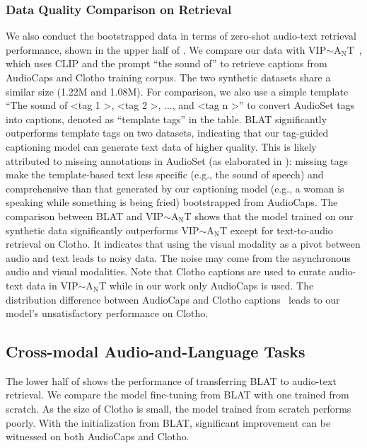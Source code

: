 \documentclass[sigconf]{acmart}
\begin{document}
\subsubsection{Data Quality Comparison on Retrieval}
We also conduct the bootstrapped data in terms of zero-shot audio-text retrieval performance, shown in the upper half of .
We compare our data with VIP$\sim$A$_\text{N}$T~\cite{zhao2022connecting}, which uses CLIP and the prompt ``the sound of'' to retrieve captions from AudioCaps and Clotho training corpus.
The two synthetic datasets share a similar size (1.22M and 1.08M).
For comparison, we also use a simple template ``The sound of \textless tag 1 \textgreater, \textless tag 2 \textgreater, ..., and \textless tag n \textgreater'' to convert AudioSet tags into captions, denoted as ``template tags'' in the table.
BLAT significantly outperforms template tags on two datasets, indicating that our tag-guided captioning model can generate text data of higher quality.
This is likely attributed to missing annotations in AudioSet (as elaborated in ): missing tags make the template-based text less specific (e.g., the sound of speech) and comprehensive than that generated by our captioning model (e.g., a woman is speaking while something is being fried) bootstrapped from AudioCaps.
The comparison between BLAT and VIP$\sim$A$_\text{N}$T shows that the model trained on our synthetic data significantly outperforms VIP$\sim$A$_\text{N}$T except for text-to-audio retrieval on Clotho.
It indicates that using the visual modality as a pivot between audio and text leads to noisy data.
The noise may come from the asynchronous audio and visual modalities.
Note that Clotho captions are used to curate audio-text data in VIP$\sim$A$_\text{N}$T while in our work only AudioCaps is used.
The distribution difference between AudioCaps and Clotho captions~\cite{martin2021diversity} leads to our model's unsatisfactory performance on Clotho.

\subsection{Cross-modal Audio-and-Language Tasks}

The lower half of  shows the performance of transferring BLAT to audio-text retrieval.
We compare the model fine-tuning from BLAT with one trained from scratch.
As the size of Clotho is small, the model trained from scratch performs poorly.
With the initialization from BLAT, significant improvement can be witnessed on both AudioCaps and Clotho.
\end{document}
